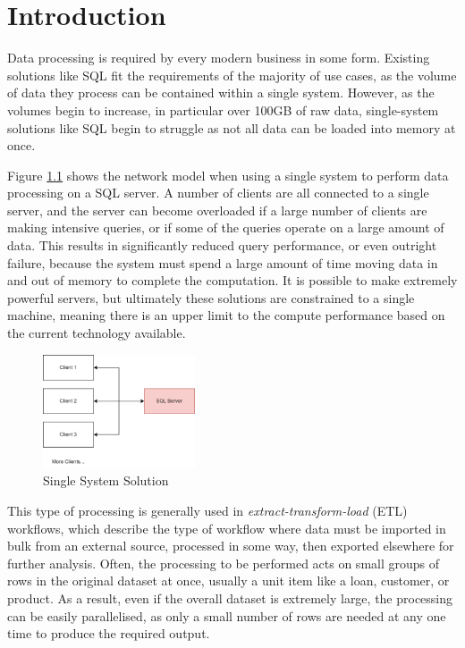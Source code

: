 \chapter{Introduction}\label{cha:intro}

Data processing is required by every modern business in some form. Existing solutions like SQL fit the requirements of the majority of use cases, as the volume of data they process can be contained within a single system. However, as the volumes begin to increase, in particular over 100GB of raw data, single-system solutions like SQL begin to struggle as not all data can be loaded into memory at once. 

Figure \ref{fig:single-system-solution} shows the network model when using a single system to perform data processing on a SQL server. A number of clients are all connected to a single server, and the server can become overloaded if a large number of clients are making intensive queries, or if some of the queries operate on a large amount of data. This results in significantly reduced query performance, or even outright failure, because the system must spend a large amount of time moving data in and out of memory to complete the computation. It is possible to make extremely powerful servers, but ultimately these solutions are constrained to a single machine, meaning there is an upper limit to the compute performance based on the current technology available.

\begin{figure}[h]
	\centering
	\includegraphics[width=0.4\textwidth]{chapters/diagrams/design/single-system-solution}
	\caption{Single System Solution}
	\label{fig:single-system-solution}
\end{figure}

This type of processing is generally used in \textit{extract-transform-load} (ETL) workflows, which describe the type of workflow where data must be imported in bulk from an external source, processed in some way, then exported elsewhere for further analysis. Often, the processing to be performed acts on small groups of rows in the original dataset at once, usually a unit item like a loan, customer, or product. As a result, even if the overall dataset is extremely large, the processing can be easily parallelised, as only a small number of rows are needed at any one time to produce the required output.

